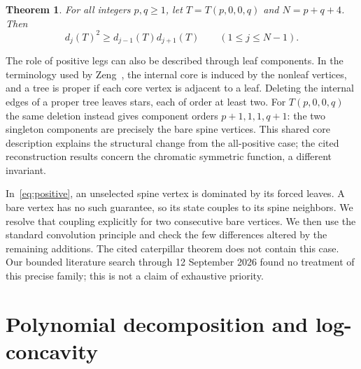\documentclass[11pt,a4paper]{article}
\newtheorem{theorem}{Theorem}
\begin{document}
\begin{theorem}\label{thm:main}
For all integers $p,q\geq1$, let $T=T(p,0,0,q)$ and $N=p+q+4$.
Then
\[
  d_j(T)^2\geq d_{j-1}(T)d_{j+1}(T)
  \qquad(1\leq j\leq N-1).
\]
\end{theorem}

The role of positive legs can also be described through leaf components.
In the terminology used by Zeng~\cite[Section~2]{Zeng2026}, the internal
core is induced by the nonleaf vertices, and a tree is proper if each core
vertex is adjacent to a leaf. Deleting the internal edges of a proper tree
leaves stars, each of order at least two. For $T(p,0,0,q)$ the same deletion
instead gives component orders $p+1,1,1,q+1$: the two singleton components
are precisely the bare spine vertices. This shared core description explains
the structural change from the all-positive case; the cited reconstruction
results concern the chromatic symmetric function, a different invariant.

In~\eqref{eq:positive}, an unselected spine vertex is dominated by its
forced leaves. A bare vertex has no such guarantee, so its state couples to
its spine neighbors. We resolve that coupling explicitly for two consecutive
bare vertices. We then use the standard convolution principle
\cite[Section~2]{Gross2015} and check the few differences altered by the
remaining additions. The cited caterpillar theorem does not contain this case.
Our bounded literature search through 12 September 2026 found no treatment of
this precise family; this is not a claim of exhaustive priority.

\section{Polynomial decomposition and log-concavity}
\end{document}

